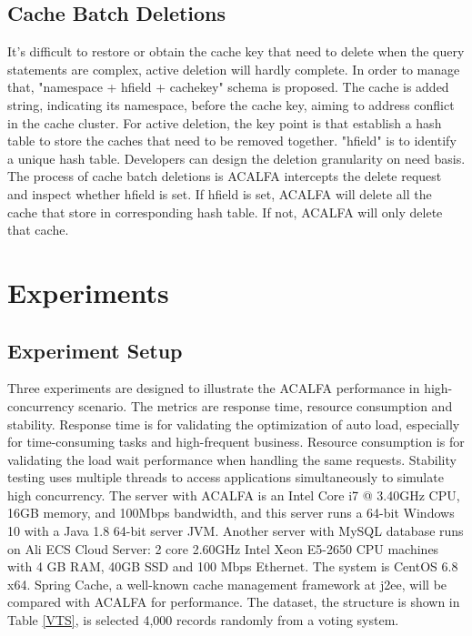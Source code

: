 \documentclass[conference]{IEEEtran}
\begin{document}
\subsection{Cache Batch Deletions}
It's difficult to restore or obtain the cache key that need to delete when the query statements are complex, active deletion will hardly complete. In order to manage that, "namespace + hfield + cachekey" schema is proposed. The cache is added string, indicating its namespace, before the cache key, aiming to address conflict in the cache cluster. For active deletion, the key point is that establish a hash table to store the caches that need to be removed together. "hfield" is to identify a unique hash table. Developers can design the deletion granularity on need basis. The process of cache batch deletions is ACALFA intercepts the delete request and inspect whether hfield is set. If hfield is set, ACALFA will delete all the cache that store in corresponding hash table. If not, ACALFA will only delete that cache.

\section{Experiments}
\label{expriments}

\subsection{Experiment Setup}
Three experiments are designed to illustrate the ACALFA performance in high-concurrency scenario. The metrics are response time, resource consumption and stability. Response time is for validating the optimization of auto load, especially for time-consuming tasks and high-frequent business. Resource consumption is for validating the load wait performance when handling the same requests. Stability testing uses multiple threads to access applications simultaneously to simulate high concurrency. The server with ACALFA is an Intel Core i7 @ 3.40GHz CPU, 16GB memory, and 100Mbps bandwidth, and this server runs a 64-bit Windows 10 with a Java 1.8 64-bit server JVM. Another server with MySQL database runs on Ali ECS Cloud Server: 2 core 2.60GHz Intel Xeon E5-2650 CPU machines with 4 GB RAM, 40GB SSD and 100 Mbps Ethernet. The system is CentOS 6.8 x64. Spring Cache, a well-known cache management framework at j2ee, will be compared with ACALFA for performance. The dataset, the structure is shown in Table \ref{VTS}, is selected 4,000 records randomly from a voting system.
\end{document}
